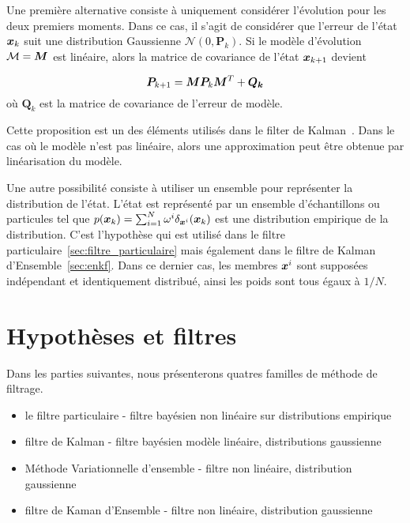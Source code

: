 Une première alternative consiste à uniquement considérer l'évolution pour les deux premiers moments. Dans ce cas, il s'agit de considérer que l'erreur de l'état $\bm{x}_k$ suit une distribution Gaussienne $\mathcal{N} (0, \bm P_k)$. Si le modèle d'évolution $\mathcal{M} = \bm{M}$ est linéaire, alors la matrice de covariance de l'état $\bm{x}_{k+1}$ devient

\begin{equation*}
    \bm{P}_{k+1} = \bm{M} \bm{P}_{k} \bm{M}^T + \bm{Q_k}
\end{equation*}où $\bm Q_k$ est la matrice de covariance de l'erreur de modèle.

Cette proposition est un des éléments utilisés dans le filter de Kalman~\cite{kalman_filter}. Dans le cas où le modèle n'est pas linéaire, alors une approximation peut être obtenue par linéarisation du modèle.

Une autre possibilité consiste à utiliser un ensemble pour représenter la distribution de l'état. L'état est représenté par un ensemble d'échantillons ou particules tel que $p(\bm{x}_k)  = \sum_{i=1}^{N} \omega^i \delta_{\bm{x}^i}(\bm{x}_k)$ est une distribution empirique de la distribution. C'est l'hypothèse qui est utilisé dans le filtre particulaire~\ref{sec:filtre_particulaire} mais également dans le filtre de Kalman d'Ensemble~\ref{sec:enkf}. Dans ce dernier cas, les membres $\bm{x}^i$ sont supposées indépendant et identiquement distribué, ainsi les poids sont tous égaux à $1/N$.


\section{Hypothèses et filtres}

Dans les parties suivantes, nous présenterons quatres familles de méthode de filtrage.

\begin{itemize}
    \item le filtre particulaire - filtre bayésien non linéaire sur distributions empirique
    \item filtre de Kalman - filtre bayésien modèle linéaire, distributions gaussienne
    \item Méthode Variationnelle d'ensemble - filtre non linéaire, distribution gaussienne
    \item filtre de Kaman d'Ensemble - filtre non linéaire, distribution gaussienne

\end{itemize}

